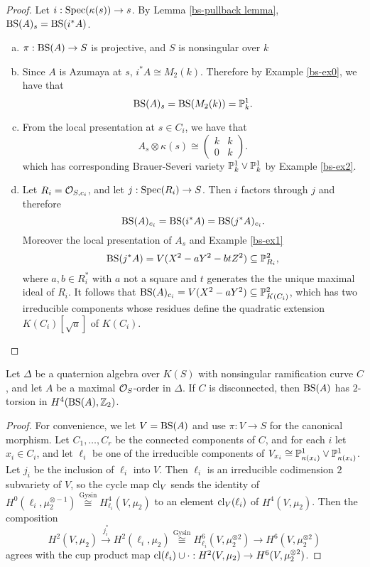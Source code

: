 \begin{proof} Let $i: \textnormal{Spec}(\kappa(s))\rightarrow s$.  By Lemma \ref{bs-pullback lemma}, $\textnormal{BS}(A)_s = \textnormal{BS}(i^*A)$.
\begin{enumerate}[(a)]
\item  $\pi: \textnormal{BS}(A)\rightarrow S$ is projective, and $S$ is nonsingular over $k$
\item  Since $A$ is Azumaya at $s$, $i^*A\cong M_2(k)$.  Therefore by Example \ref{bs-ex0}, we have that
$$\textnormal{BS}(A)_s = \textnormal{BS}(M_2(k)) = \mathbb{P}^1_k.$$
\item
From the local presentation at $s\in C_i$, we have that
$$A_s\otimes\kappa(s) \cong\left(\begin{array}{cc}
k & k\\
0 & k
\end{array}\right).$$
which has corresponding Brauer-Severi variety $\mathbb{P}^1_k\vee\mathbb{P}^1_k$ by Example \ref{bs-ex2}.
\item
Let $R_i = \mathcal{O}_{S,c_i}$, and let $j: \textnormal{Spec}(R_i)\rightarrow S$.  Then $i$ factors through $j$ and therefore
$$\textnormal{BS}(A)_{c_i} = \textnormal{BS}(i^*A) = \textnormal{BS}(j^*A)_{c_i}.$$
Moreover the local presentation of $A_s$ and Example \ref{bs-ex1}
$$\textnormal{BS}(j^*A) = V(X^2 - aY^2 - btZ^2)\subseteq \mathbb{P}^2_{R_i},$$
where $a,b\in R_i^*$ with $a$ not a square and $t$ generates the the unique maximal ideal of $R_i$.  It follows that $\textnormal{BS}(A)_{c_i} = V(X^2-aY^2)\subseteq \mathbb{P}^2_{K(C_i)}$, which has two irreducible components whose residues define the quadratic extension $K(C_i)[\sqrt{a}]$ of $K(C_i)$.
\end{enumerate}
\end{proof}

\begin{prop}
Let $\Delta$ be a quaternion algebra over $K(S)$ with nonsingular ramification curve $C$, and let $A$ be a maximal $\mathcal{O}_S$-order in $\Delta$.  If $C$ is disconnected, then $\textnormal{BS}(A)$ has $2$-torsion in $H^4(\textnormal{BS}(A),\mathbb{Z}_2)$.
\end{prop}
\begin{proof}
For convenience, we let $V = \textnormal{BS}(A)$ and use $\pi: V\rightarrow S$ for the canonical morphism.  Let $C_1,\dots, C_r$ be the connected components of $C$, and for each $i$ let $x_i\in C_i$, and let $\ell_i$ be one of the irreducible components of $V_{x_i}\cong \mathbb{P}^1_{\kappa(x_i)}\vee\mathbb{P}^1_{\kappa(x_i)}$.  Let $j_i$ be the inclusion of $\ell_i$ into $V$.  Then $\ell_i$ is an irreducible codimension $2$ subvariety of $V$, so the cycle map $\textnormal{cl}_V$ sends the identity of $H^0(\ell_i,\mu_2^{\otimes-1})\stackrel{\text{Gysin}}{\cong} H^4_{\ell_i}(V,\mu_2)$ to an element $\textnormal{cl}_{V}(\ell_i)$ of $H^4(V,\mu_2)$.
Then the composition
$$H^2(V,\mu_2)\xrightarrow{j_i^*} H^2(\ell_i,\mu_2)\stackrel{\text{Gysin}}{\cong} H^6_{\ell_i}(V,\mu_2^{\otimes 2})\rightarrow H^6(V,\mu_2^{\otimes 2})$$
agrees with the cup product map $\textnormal{cl}(\ell_i)\cup\cdot: H^2(V,\mu_2)\rightarrow H^6(V,\mu_2^{\otimes 2})$.
\end{proof}


